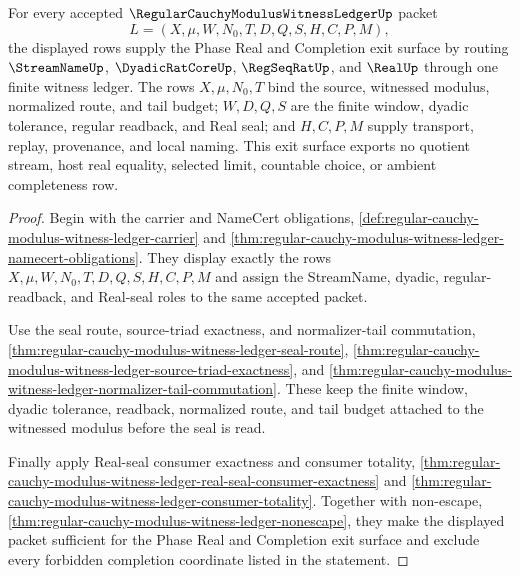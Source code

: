 \begin{theorem}
\label{thm:regular-cauchy-modulus-witness-ledger-open-phase-exit-sufficiency}
For every accepted $\RegularCauchyModulusWitnessLedgerUp$ packet
$$
L=(X,\mu,W,N_0,T,D,Q,S,H,C,P,M),
$$
the displayed rows supply the Phase Real and Completion exit surface by routing $\StreamNameUp$, $\DyadicRatCoreUp$, $\RegSeqRatUp$, and $\RealUp$ through one finite witness ledger. The rows $X,\mu,N_0,T$ bind the source, witnessed modulus, normalized route, and tail budget; $W,D,Q,S$ are the finite window, dyadic tolerance, regular readback, and Real seal; and $H,C,P,M$ supply transport, replay, provenance, and local naming. This exit surface exports no quotient stream, host real equality, selected limit, countable choice, or ambient completeness row.
\end{theorem}
\begin{proof}
Begin with the carrier and NameCert obligations, \autoref{def:regular-cauchy-modulus-witness-ledger-carrier} and \autoref{thm:regular-cauchy-modulus-witness-ledger-namecert-obligations}. They display exactly the rows $X,\mu,W,N_0,T,D,Q,S,H,C,P,M$ and assign the StreamName, dyadic, regular-readback, and Real-seal roles to the same accepted packet.

Use the seal route, source-triad exactness, and normalizer-tail commutation, \autoref{thm:regular-cauchy-modulus-witness-ledger-seal-route}, \autoref{thm:regular-cauchy-modulus-witness-ledger-source-triad-exactness}, and \autoref{thm:regular-cauchy-modulus-witness-ledger-normalizer-tail-commutation}. These keep the finite window, dyadic tolerance, readback, normalized route, and tail budget attached to the witnessed modulus before the seal is read.

Finally apply Real-seal consumer exactness and consumer totality, \autoref{thm:regular-cauchy-modulus-witness-ledger-real-seal-consumer-exactness} and \autoref{thm:regular-cauchy-modulus-witness-ledger-consumer-totality}. Together with non-escape, \autoref{thm:regular-cauchy-modulus-witness-ledger-nonescape}, they make the displayed packet sufficient for the Phase Real and Completion exit surface and exclude every forbidden completion coordinate listed in the statement.
\end{proof}

